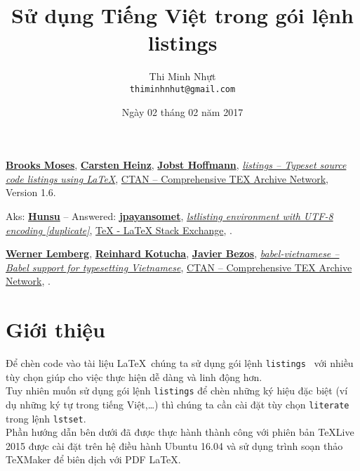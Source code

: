 \documentclass[12pt,a4paper]{article}
\title{\bfseries Sử dụng Tiếng Việt trong gói lệnh listings}
\author{Thi Minh Nhựt \bigskip \\ \tt thiminhnhut@gmail.com}
\date{Ngày 02 tháng 02 năm 2017}
\begin{document}
\maketitle
\tableofcontents

\begin{thebibliography}{99}
	 \href{https://www.ctan.org/author/moses}{\textbf{Brooks Moses}}, \href{https://www.ctan.org/author/heinz}{\textbf{Carsten Heinz}}, \href{https://www.ctan.org/author/hoffmann}{\textbf{Jobst Hoffmann}}, \href{https://www.ctan.org/pkg/listings}{\emph{listings – Typeset source code listings using LaTeX}}, \href{https://www.ctan.org/}{CTAN -- Comprehensive TEX Archive Network}, Version 1.6.
	
	 Aks: \href{https://goo.gl/9VxuIW}{\textbf{Hunsu}} -- Answered: \href{https://goo.gl/3fO9ec}{\textbf{jpayansomet}}, \href{https://goo.gl/8yvdB2}{\emph{lstlisting environment with UTF-8 encoding [duplicate]}}, \href{http://tex.stackexchange.com/}{TeX - LaTeX Stack Exchange}, .
	
	 \href{https://www.ctan.org/author/lemberg}{\textbf{Werner Lemberg}}, \href{https://www.ctan.org/author/kotucha}{\textbf{Reinhard Kotucha}}, \href{https://www.ctan.org/author/bezos}{\textbf{Javier Bezos}}, \href{https://www.ctan.org/pkg/babel-vietnamese}{\emph{babel-vietnamese – Babel support for typesetting Vietnamese}}, \href{https://www.ctan.org/}{CTAN -- Comprehensive TEX Archive Network}, .
\end{thebibliography}

\section{Giới thiệu}
	Để chèn code vào tài liệu \LaTeX\, chúng ta sử dụng gói lệnh \verb|listings|~\cite{listings-ctan} với nhiều tùy chọn giúp cho việc thực hiện dễ dàng và linh động hơn.\\
	
	Tuy nhiên muốn sử dụng gói lệnh \verb|listings| để chèn những ký hiệu đặc biệt (ví dụ những ký tự trong tiếng Việt,\ldots) thì chúng ta cần cài đặt tùy chọn \verb|literate| trong lệnh \verb|lstset|.\\
	
	Phần hướng dẫn bên dưới đã được thực hành thành công với phiên bản \TeX Live 2015 được cài đặt trên hệ điều hành Ubuntu 16.04 và sử dụng trình soạn thảo \TeX Maker để biên dịch với PDF \LaTeX. \\
	
\end{document}
